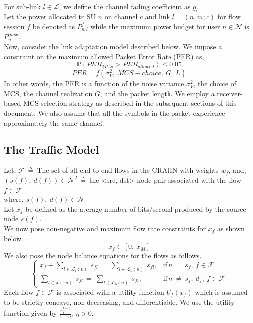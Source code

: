 \documentclass[12pt, draftcls, onecolumn]{IEEEtran}
\begin{document}
\\For sub-link $l \in \mathcal{L}$, we define the channel fading coefficient as $g_l$.
\\Let the power allocated to SU $n$ on channel $c$ and link $l = (n,m;c)$ for flow session $f$ be denoted as $P_{n,l}^f$ while the maximum power budget for user $n \in \mathcal{N}$ is $P_n^{max}$.
\\Now, consider the link adaptation model described below.
We impose a constraint on the maximum allowed Packet Error Rate (PER) as,
\[\mathbb{P}(PER_{MCS} > PER_{allowed}) \leq 0.05\]
\[PER = f(\sigma_V^2,\ MCS-choice,\ G,\ L)\]
In other words, the PER is a function of the noise variance $\sigma_V^2$, the choice of MCS, the channel realization $G$, and the packet length.
We employ a receiver-based MCS selection strategy as described in the subsequent sections of this document. We also assume that all the symbols in the packet experience approximately the same channel.
\subsection{The Traffic Model}
Let, $\mathcal{F}\ \triangleq\ $The set of all end-to-end flows in the CRAHN with weights $w_f$, and,
\\$(s(f),\ d(f)) \in \mathcal{N}^2\ \triangleq\ $the <src, dst> node pair associated with the flow $f \in \mathcal{F}$
\\where, $s(f),\ d(f) \in \mathcal{N}$.
\\Let $x_f$ be defined as the average number of bits/second produced by the source node $s(f)$.
\\We now pose non-negative and maximum flow rate constraints for $x_f$ as shown below.
\[x_f \in [0,\ x_M]\]
We also pose the node balance equations for the flows as follows,
\begin{equation*}
    \begin{cases}
        x_f + \sum_{l \in \mathcal{L}_i(n)}\ s_{fl}\ =\ \sum_{l \in \mathcal{L}_o(n)}\ s_{fl}, & \text{if}\ n\ =\ s_{f},\ f \in \mathcal{F}\\
        \sum_{l \in \mathcal{L}_i(n)}\ s_{fl}\ =\ \sum_{l \in \mathcal{L}_o(n)}\ s_{fl}, & \text{if}\ n\ \not=\ s_{f},\ d_f,\ f \in \mathcal{F}
    \end{cases}
\end{equation*}
Each flow $f \in \mathcal{F}$ is associated with a utility function $U_f(x_f)$ which is assumed to be strictly concave, non-decreasing, and differentiable. We use the utility function given by $\frac{x_f^{1-\eta}}{1-\eta},\ \eta > 0$.
\end{document}
